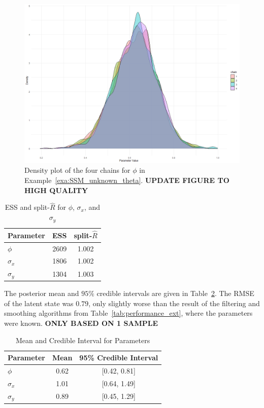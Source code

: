 \begin{example}
	\begin{figure}
		\centering
		\includegraphics[width=\textwidth]{phi_density_plot.png}
		\caption{Density plot of the four chains for $\phi$ in Example~\ref{exa:SSM_unknown_theta}.
		\textbf{UPDATE FIGURE TO HIGH QUALITY}}
		\label{fig:phi_dens}
	\end{figure}
	
	\begin{table}
		\centering
		\caption{ESS and split-\(\widehat{R}\) for \(\phi\), \(\sigma_x\), and \(\sigma_y\)}
		\label{tab:diagnostics}
		\begin{tabular}{lcc}
			\toprule
			Parameter & ESS & split-\(\widehat{R}\) \\
			\midrule
			\(\phi\)       & 2609  & 1.002 \\
			\(\sigma_x\)   & 1806  & 1.002 \\
			\(\sigma_y\)   & 1304  & 1.003 \\
			\bottomrule
		\end{tabular}
	\end{table}
	
	The posterior mean and $95\%$ credible intervals are given in Table~\ref{tab:mean_credible_interval}. The RMSE of the latent state was $0.79$, only slightly worse than the result of the filtering and smoothing algorithms from Table~\ref{tab:performance_ext}, where the parameters were known. \textbf{ONLY BASED ON 1 SAMPLE}
	\begin{table}
		\centering
		\caption{Mean and Credible Interval for Parameters}
		\label{tab:mean_credible_interval}
		\begin{tabular}{lcc}
			\toprule
			Parameter & Mean & 95\% Credible Interval \\
			\midrule
			\(\phi\)       & 0.62  & [0.42, 0.81] \\
			\(\sigma_x\)   & 1.01  & [0.64, 1.49] \\
			\(\sigma_y\)   & 0.89  & [0.45, 1.29] \\
			\bottomrule
		\end{tabular}
	\end{table}
\end{example}



